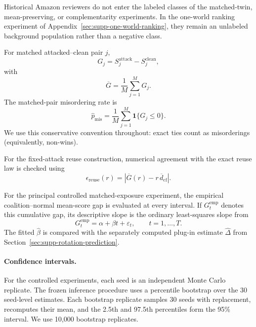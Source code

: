 Historical Amazon reviewers do not enter the labeled classes of the
matched-twin, mean-preserving, or complementarity experiments. In the
one-world ranking experiment of
Appendix~\ref{sec:supp-one-world-ranking}, they remain an unlabeled
background population rather than a negative class.

For matched attacked--clean pair $j$,
\begin{equation}
\label{eq:supp-pair-gap}
G_j
=
S_j^{\mathrm{attack}}
-
S_j^{\mathrm{clean}},
\end{equation}
with
\[
\overline G
=
\frac{1}{M}
\sum_{j=1}^{M}G_j.
\]
The matched-pair misordering rate is
\begin{equation}
\label{eq:supp-misordering}
\widehat p_{\mathrm{mis}}
=
\frac{1}{M}
\sum_{j=1}^{M}
\mathbf 1\{G_j\leq0\}.
\end{equation}
We use this conservative convention throughout: exact ties count as
misorderings (equivalently, non-wins).

For the fixed-attack reuse construction, numerical agreement with the exact
reuse law is checked using
\begin{equation}
\label{eq:supp-reuse-error}
\epsilon_{\mathrm{reuse}}(r)
=
\left|
\overline G(r)
-
r\,\overline d_{\mathrm{cf}}
\right|.
\end{equation}

For the principal controlled matched-exposure experiment, the empirical
coalition--normal mean-score gap is evaluated at every interval. If
$G_t^{\mathrm{emp}}$ denotes this cumulative gap, its descriptive slope is the
ordinary least-squares slope from
\begin{equation}
\label{eq:supp-controlled-slope}
G_t^{\mathrm{emp}}
=
\alpha+\beta t+\varepsilon_t,
\qquad
t=1,\ldots,T.
\end{equation}
The fitted $\widehat{\beta}$ is compared with the separately computed
plug-in estimate $\widehat{\Delta}$  from Section~\ref{sec:supp-rotation-prediction}.

\paragraph{Confidence intervals.}
For the controlled experiments, each seed is an independent Monte Carlo
replicate. The frozen inference procedure uses a percentile bootstrap over
the 30 seed-level estimates. Each bootstrap replicate samples 30 seeds with
replacement, recomputes their mean, and the 2.5th and 97.5th percentiles form
the 95\% interval. We use 10,000 bootstrap replicates.

